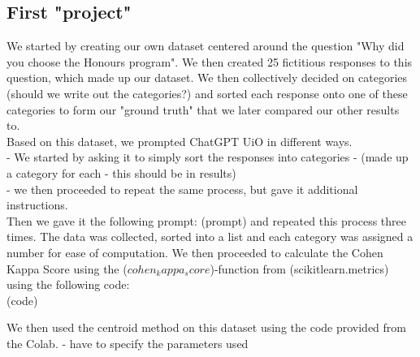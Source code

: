 \subsection*{First "project"}
\begin{flushleft}
We started by creating our own dataset centered around the question "Why did you choose the Honours program".
We then created 25 fictitious responses to this question, which made up our dataset. We then collectively decided on categories 
(should we write out the categories?) and sorted each response onto one of these categories to form our "ground truth" that we later 
compared our other results to. \\
Based on this dataset, we prompted ChatGPT UiO in different ways. \\
- We started by asking it to simply sort the responses into categories - (made up a category for each - this should be in results)\\
- we then proceeded to repeat the same process, but gave it additional instructions.\\[10pt]

Then we gave it the following prompt: (prompt) and repeated this process three times. The data was collected, sorted into a list and each category was assigned
a number for ease of computation. We then proceeded to calculate the Cohen Kappa Score using the ($cohen_kappa_score$)-function from (scikitlearn.metrics) using the following code:\\
(code)

We then used the centroid method on this dataset using the code provided from the Colab. - have to specify the parameters used


\end{flushleft}
